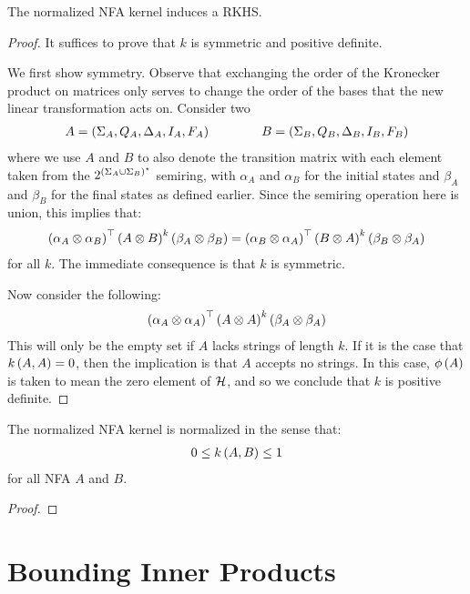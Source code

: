 \documentclass[12pt]{article}
\begin{document}
\begin{theorem}
  The normalized NFA kernel induces a RKHS.
\end{theorem}
\begin{proof}
  It suffices to prove that \(k\) is symmetric and
  positive definite.

  We first show symmetry.
  Observe that exchanging the order of the Kronecker product
  on matrices only serves to change the order of the bases that the
  new linear transformation acts on.
  Consider two
  \begin{align*}
    A = \left(\Sigma_A, Q_A, \Delta_A, I_A, F_A\right)
    \qquad \qquad
    B = \left(\Sigma_B, Q_B, \Delta_B, I_B, F_B\right)
  \end{align*}
  where we use \(A\) and \(B\) to also denote the transition matrix
  with each element taken from the
  \(2^{\left(\Sigma_A \cup \Sigma_B\right)^\star}\) semiring,
  with \(\alpha_A\) and \(\alpha_B\) for the initial states
  and \(\beta_A\) and \(\beta_B\) for the final states as defined earlier.
  Since the semiring operation here is union, this implies that:
  \begin{align*}
    \left(\alpha_A \otimes \alpha_B\right)^\top
    \left(A \otimes B\right)^k
    \left(\beta_A \otimes \beta_B\right)
    =
    \left(\alpha_B \otimes \alpha_A\right)^\top
    \left(B \otimes A\right)^k
    \left(\beta_B \otimes \beta_A\right)
  \end{align*}
  for all \(k\).
  The immediate consequence is that \(k\) is symmetric.

  Now consider the following:
  \begin{align*}
    \left(\alpha_A \otimes \alpha_A\right)^\top
    \left(A \otimes A\right)^k
    \left(\beta_A \otimes \beta_A\right)
  \end{align*}
  This will only be the empty set if \(A\)
  lacks strings of length \(k\).
  If it is the case that \(k\left(A, A\right) = 0\),
  then the implication is that \(A\) accepts no strings.
  In this case, \(\phi\left(A\right)\) is taken to mean the zero element of
  \(\mathcal{H}\),
  and so we conclude that \(k\) is positive definite.

\end{proof}


\begin{theorem}
  The normalized NFA kernel is normalized in the sense that:
  \begin{align*}
    0 \leq k\left(A, B\right) \leq 1
  \end{align*}
  for all NFA \(A\) and \(B\).
\end{theorem}
\begin{proof}

\end{proof}




\section{Bounding Inner Products}




\printbibliography
\end{document}
